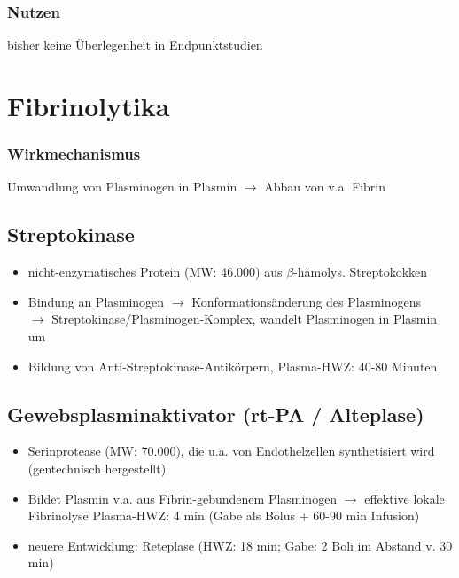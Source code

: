 \documentclass[10pt,a4paper]{report}
\begin{document}
\subsubsection{Nutzen} %
\label{par:nutzen}
bisher keine Überlegenheit in Endpunktstudien
\section{Fibrinolytika} %
\label{sec:fibrinolytika}
\subsubsection{Wirkmechanismus} %
\label{par:wirkmechanismus}
Umwandlung von Plasminogen in Plasmin $\rightarrow$ Abbau von v.a. Fibrin
\subsection{Streptokinase} %
\label{ssub:streptokinase}
\begin{itemize}
	\item nicht-enzymatisches Protein (MW: 46.000) aus $\beta$-hämolys. Streptokokken 
	\item Bindung an Plasminogen $\rightarrow$ Konformationsänderung  des Plasminogens \\
	$\rightarrow$ Streptokinase/Plasminogen-Komplex, wandelt Plasminogen in Plasmin um
	\item Bildung von Anti-Streptokinase-Antikörpern, Plasma-HWZ: 40-80 Minuten
\end{itemize}
\subsection{Gewebsplasminaktivator (rt-PA / Alteplase)} %
\label{ssub:gewebsplasminaktivator_rt_pa_alteplase_}
\begin{itemize}
	\item Serinprotease (MW: 70.000), 
	die u.a. von Endothelzellen synthetisiert wird (gentechnisch hergestellt)
	\item Bildet Plasmin v.a. aus Fibrin-gebundenem Plasminogen 
	$\rightarrow$ effektive lokale Fibrinolyse Plasma-HWZ: 4 min (Gabe als Bolus + 60-90 min Infusion)
	\item neuere Entwicklung: Reteplase (HWZ: 18 min; Gabe: 2 Boli im Abstand v. 30 min)
\end{itemize}
\end{document}
